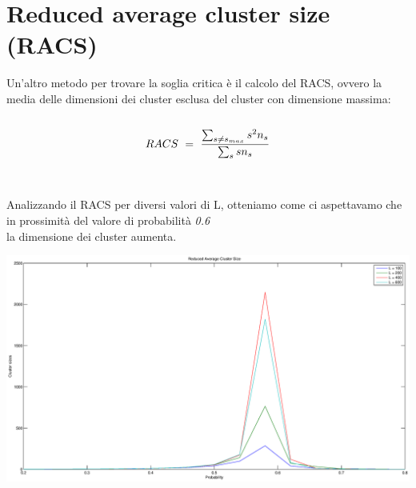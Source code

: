 \documentclass[10pt,a4paper]{article}
\begin{document}
\section{Reduced average cluster size (RACS)}
Un'altro metodo per trovare la soglia critica è il calcolo del RACS, ovvero la media delle dimensioni dei cluster esclusa del cluster con dimensione massima:\\\\
\[RACS \ = \ \frac{\sum_{s \neq s_{max}}s^2n_{s}}{\sum_{s}sn_{s}} \\ \]\\\\
Analizzando il RACS per diversi valori di L, otteniamo come ci aspettavamo che in prossimità del valore di probabilità  \emph{0.6}\\ la dimensione dei cluster aumenta.

\centerline{\includegraphics[scale=0.5]{racs.eps}}
\end{document}
